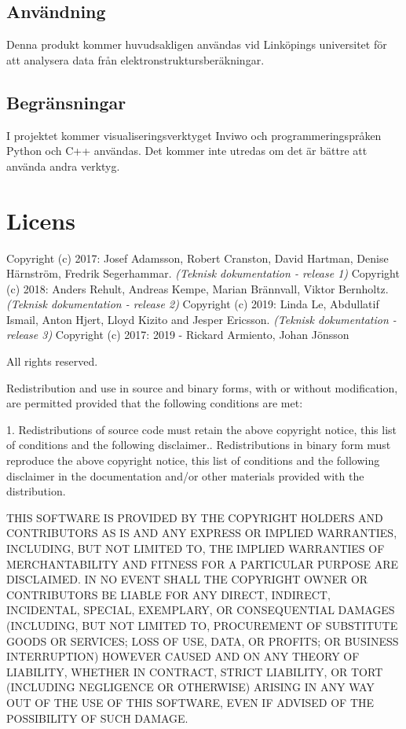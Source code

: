 \documentclass[a4paper,12pt]{article}
\begin{document}
\subsection{Användning}
Denna produkt kommer huvudsakligen användas vid Linköpings universitet för att analysera data från elektronstruktursberäkningar.

\subsection{Begränsningar}
I projektet kommer visualiseringsverktyget Inviwo och programmeringspråken Python och C++ användas. Det kommer inte utredas om det är bättre att använda andra verktyg.


\newpage 
\section{Licens}
\label{ref:licens}
Copyright (c) 2017: Josef Adamsson, Robert Cranston, David Hartman, Denise Härnström, Fredrik Segerhammar. \textit{(Teknisk dokumentation - release 1)}\newline
Copyright (c) 2018: Anders Rehult, Andreas Kempe, Marian Brännvall, Viktor Bernholtz. \textit{(Teknisk dokumentation - release 2)}\newline
Copyright (c) 2019: Linda Le, Abdullatif Ismail, Anton Hjert, Lloyd Kizito and Jesper Ericsson. \textit{(Teknisk dokumentation - release 3)}\newline
Copyright (c) 2017: 2019 - Rickard Armiento, Johan Jönsson

All rights reserved.

Redistribution and use in source and binary forms, with or without
modification, are permitted provided that the following conditions are met:

1. Redistributions of source code must retain the above copyright notice, this list of conditions and the following disclaimer.. Redistributions in binary form must reproduce the above copyright notice, this list of conditions and the following disclaimer in the documentation and/or other materials provided with the distribution.

THIS SOFTWARE IS PROVIDED BY THE COPYRIGHT HOLDERS AND CONTRIBUTORS AS IS AND ANY EXPRESS OR IMPLIED WARRANTIES, INCLUDING,
BUT NOT LIMITED TO, THE IMPLIED WARRANTIES OF MERCHANTABILITY AND FITNESS FOR A PARTICULAR PURPOSE ARE DISCLAIMED. IN NO EVENT
SHALL THE COPYRIGHT OWNER OR CONTRIBUTORS BE LIABLE FOR ANY DIRECT, INDIRECT, INCIDENTAL, SPECIAL, EXEMPLARY, OR CONSEQUENTIAL
DAMAGES (INCLUDING, BUT NOT LIMITED TO, PROCUREMENT OF SUBSTITUTE GOODS OR SERVICES; LOSS OF USE, DATA, OR PROFITS; OR BUSINESS
INTERRUPTION) HOWEVER CAUSED AND ON ANY THEORY OF LIABILITY, WHETHER IN CONTRACT, STRICT LIABILITY, OR TORT (INCLUDING
NEGLIGENCE OR OTHERWISE) ARISING IN ANY WAY OUT OF THE USE OF THIS SOFTWARE, EVEN IF ADVISED OF THE POSSIBILITY OF SUCH DAMAGE.
\newpage 
\end{document}
